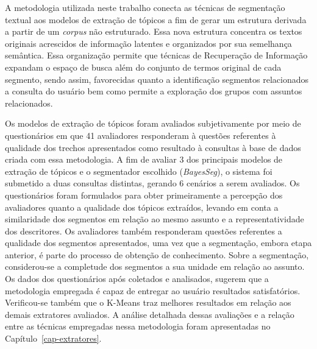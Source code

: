 %
A metodologia utilizada neste trabalho conecta as técnicas de segmentação textual aos modelos de extração de tópicos a fim de gerar um estrutura derivada a partir de um \textit{corpus} não estruturado. Essa nova estrutura concentra os textos originais acrescidos de informação latentes e organizados por sua semelhança semântica. Essa organização permite que técnicas de Recuperação de Informação expandam o espaço de busca além do conjunto de termos original de cada segmento, sendo assim, favorecidas quanto a identificação segmentos relacionados a consulta do usuário bem como permite a exploração dos grupos com assuntos relacionados.







Os modelos de extração de tópicos foram avaliados subjetivamente por meio de questionários em que 41 avaliadores responderam à questões referentes à qualidade dos trechos apresentados como resultado à consultas à base de dados criada com essa metodologia. 
A fim de avaliar 3 dos principais modelos de extração de tópicos e o segmentador escolhido (\textit{BayesSeg}), o sistema foi submetido a duas consultas distintas, gerando 6 cenários a serem avaliados. 
Os questionários foram formulados para obter primeiramente a percepção dos avaliadores quanto a qualidade dos tópicos extraídos, levando em conta a similaridade dos segmentos em relação ao mesmo assunto e a representatividade dos descritores. 
Os avaliadores também responderam questões referentes a qualidade dos segmentos apresentados, uma vez que a segmentação, embora etapa anterior, é parte do processo de obtenção de conhecimento. Sobre a segmentação, considerou-se a completude dos segmentos a sua unidade em relação ao assunto.
Os dados dos questionários após coletados e analisados, sugerem que a metodologia empregada é capaz de entregar ao usuário resultados satisfatórios. Verificou-se também que o K-Means traz melhores resultados em relação aos demais extratores avaliados. 
A análise detalhada dessas avaliações e a relação entre as técnicas empregadas nessa metodologia foram apresentadas no Capítulo~\ref{cap-extratores}.



